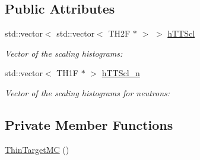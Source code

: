 \subsection*{Public Attributes}
\begin{DoxyCompactItemize}
\item 
std\-::vector$<$ std\-::vector$<$ T\-H2\-F $\ast$ $>$ $>$ \hyperlink{class_neutrino_flux_reweight_1_1_thin_target_m_c_ad9a8f8e4902dc073e8a6fb6bbd1be893}{h\-T\-T\-Scl}
\begin{DoxyCompactList}\small\item\em Vector of the scaling histograms\-: \end{DoxyCompactList}\item 
std\-::vector$<$ T\-H1\-F $\ast$ $>$ \hyperlink{class_neutrino_flux_reweight_1_1_thin_target_m_c_ad04c688c4b9d94453399329ac4fcc16d}{h\-T\-T\-Scl\-\_\-n}
\begin{DoxyCompactList}\small\item\em Vector of the scaling histograms for neutrons\-: \end{DoxyCompactList}\end{DoxyCompactItemize}
\subsection*{Private Member Functions}
\begin{DoxyCompactItemize}
\item 
\hyperlink{class_neutrino_flux_reweight_1_1_thin_target_m_c_a8353f4001f3e3c4ba74bc434c18f8e6b}{Thin\-Target\-M\-C} ()
\end{DoxyCompactItemize}
